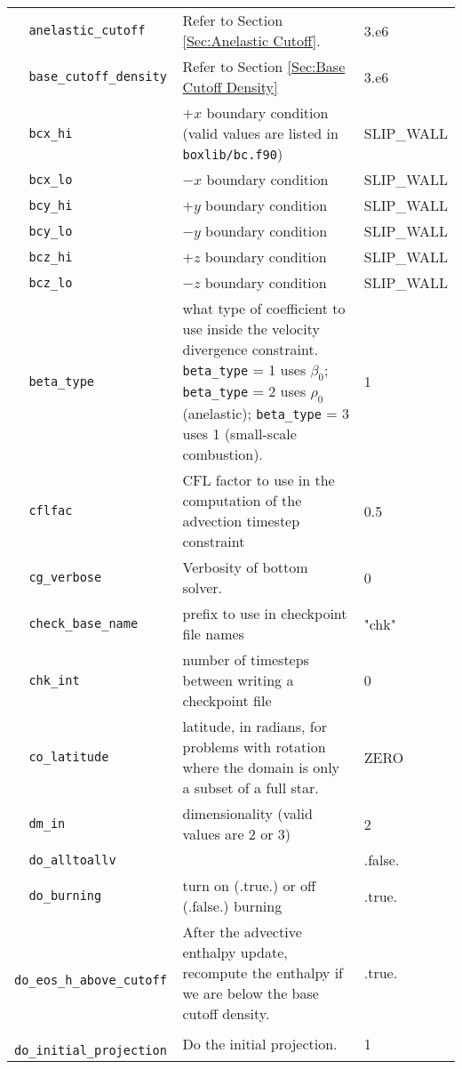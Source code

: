 {\begin{center}
\begin{longtable}{|l|p{3.25in}|l|}
\verb=  anelastic_cutoff =  & Refer to Section \ref{Sec:Anelastic Cutoff}.  &  3.e6 \\
\verb=  base_cutoff_density =  & Refer to Section \ref{Sec:Base Cutoff Density}  &  3.e6 \\
\verb=  bcx_hi =  & $+x$ boundary condition (valid values are listed in {\tt  boxlib/bc.f90})  &  SLIP\_WALL \\
\verb=  bcx_lo =  & $-x$ boundary condition  &  SLIP\_WALL \\
\verb=  bcy_hi =  & $+y$ boundary condition  &  SLIP\_WALL \\
\verb=  bcy_lo =  & $-y$ boundary condition  &  SLIP\_WALL \\
\verb=  bcz_hi =  & $+z$ boundary condition  &  SLIP\_WALL \\
\verb=  bcz_lo =  & $-z$ boundary condition  &  SLIP\_WALL \\
\verb=  beta_type =  & what type of coefficient to use inside the velocity divergence constraint.  
                           {\tt beta\_type} = 1 uses $\beta_0$; {\tt beta\_type} = 2 uses $\rho_0$ (anelastic);
                           {\tt beta\_type} = 3 uses 1 (small-scale combustion).  &  1 \\
\verb=  cflfac =  & CFL factor to use in the computation of the advection timestep constraint  &  0.5 \\
\verb=  cg_verbose =  & Verbosity of bottom solver.  &  0 \\
\verb=  check_base_name =  & prefix to use in checkpoint file names  &  "chk" \\
\verb=  chk_int =  & number of timesteps between writing a checkpoint file  & 0 \\
\verb=  co_latitude =  & latitude, in radians, for problems with rotation where the domain is only a subset
                             of a full star.  &  ZERO \\
\verb=  dm_in =  & dimensionality (valid values are 2 or 3)  &  2 \\
\verb=  do_alltoallv =  &   &  .false. \\
\verb=  do_burning =  & turn on (.true.) or off (.false.) burning  &  .true. \\
\verb=  do_eos_h_above_cutoff =  & After the advective enthalpy update, recompute the enthalpy if we are 
                                         below the base cutoff density.   &  .true. \\
\verb=  do_initial_projection =  & Do the initial projection.  & 1 \\

\end{longtable}
\end{center}}
